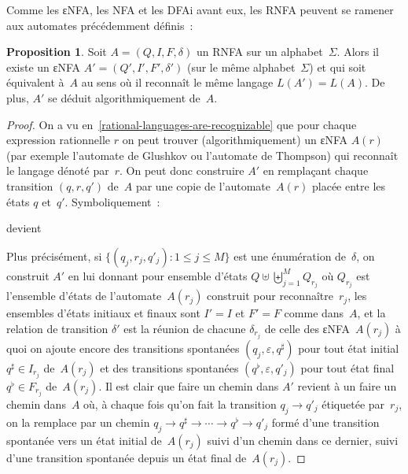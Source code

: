 \documentclass[12pt,a4paper]{article}
\theoremstyle{definition}
\newtheorem{prop}[comcnt]{Proposition}
\begin{document}
\medskip

Comme les εNFA, les NFA et les DFAi avant eux, les RNFA peuvent se
ramener aux automates précédemment définis :

\begin{prop}
Soit $A = (Q,I,F,\delta)$ un RNFA sur un alphabet $\Sigma$.  Alors il
existe un εNFA $A' = (Q',I',F',\delta')$ (sur le même
alphabet $\Sigma$) et qui soit équivalent à $A$ au sens où il
reconnaît le même langage $L(A') = L(A)$.  De plus, $A'$ se déduit
algorithmiquement de $A$.
\end{prop}
\begin{proof}
On a vu en \ref{rational-languages-are-recognizable} que pour chaque
expression rationnelle $r$ on peut trouver (algorithmiquement) un εNFA
$A(r)$ (par exemple l'automate de Glushkov ou l'automate de Thompson)
qui reconnaît le langage dénoté par $r$.  On peut donc construire $A'$
en remplaçant chaque transition $(q,r,q')$ de $A$ par une copie de
l'automate $A(r)$ placée entre les états $q$ et $q'$.  Symboliquement :

\begin{center}
\quad devient\quad
{}
\end{center}

Plus précisément, si $\{(q_j,r_j,q'_j) : 1\leq j\leq M\}$ est une
énumération de $\delta$, on construit $A'$ en lui donnant pour
ensemble d'états $Q \uplus \biguplus_{j=1}^M Q_{r_j}$ où $Q_{r_j}$ est
l'ensemble d'états de l'automate $A(r_j)$ construit pour
reconnaître $r_j$, les ensembles d'états initiaux et finaux sont
$I'=I$ et $F'=F$ comme dans $A$, et la relation de transition
$\delta'$ est la réunion de chacune $\delta_{r_j}$ de celle des
εNFA $A(r_j)$ à quoi on ajoute encore des transitions spontanées
$(q_j,\varepsilon,q^\sharp)$ pour tout état initial $q^\sharp \in
I_{r_j}$ de $A(r_j)$ et des transitions spontanées
$(q^\flat,\varepsilon,q'_j)$ pour tout état final $q^\flat \in
F_{r_j}$ de $A(r_j)$.  Il est clair que faire un chemin dans $A'$
revient à un faire un chemin dans $A$ où, à chaque fois qu'on fait la
transition $q_j\to q'_j$ étiquetée par $r_j$, on la remplace par un
chemin $q_j \to q^\sharp \to \cdots \to q^\flat \to q'_j$ formé d'une
transition spontanée vers un état initial de $A(r_j)$ suivi d'un
chemin dans ce dernier, suivi d'une transition spontanée depuis un
état final de $A(r_j)$.
\end{proof}
\end{document}
